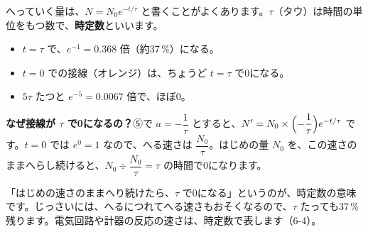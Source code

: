 \label{bk:5-14:tau}\noindent\begin{minipage}[c]{0.52\linewidth}
\end{minipage}\hfill
\begin{minipage}[c]{0.44\linewidth}
へっていく量は、$N=N_0e^{-t/\tau}$ と書くことがよくあります。$\tau$（タウ）は時間の単位をもつ数で、\textbf{時定数}といいます。
\begin{itemize}[leftmargin=1.2\zw, itemsep=1pt, topsep=2pt, label={\color{bkTheme}●}]
\item $t=\tau$ で、$e^{-1}=0.368$ 倍（約37\,\%）になる。
\item $t=0$ での接線（オレンジ）は、ちょうど $t=\tau$ で0になる。
\item $5\tau$ たつと $e^{-5}=0.0067$ 倍で、ほぼ0。
\end{itemize}
\end{minipage}\par
\noindent\textbf{なぜ接線が $\tau$ で0になるの？}\quad ⑤で $a=-\dfrac{1}{\tau}$ とすると、$N'=N_0\times\Bigl(-\dfrac{1}{\tau}\Bigr)e^{-t/\tau}$ です。$t=0$ では $e^0=1$ なので、へる速さは $\dfrac{N_0}{\tau}$。はじめの量 $N_0$ を、この速さのままへらし続けると、$N_0\div\dfrac{N_0}{\tau}=\tau$ の時間で0になります。

「はじめの速さのままへり続けたら、$\tau$ で0になる」というのが、時定数の意味です。じっさいには、へるにつれてへる速さもおそくなるので、$\tau$ たっても37\,\%残ります。電気回路や計器の反応の速さは、時定数で表します（6-4）。


